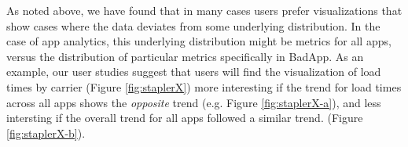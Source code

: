 \begin{example}
As noted above, we have found that in many cases 
users prefer visualizations that show
cases where the data deviates from some underlying distribution.
In the case of app analytics, this underlying distribution might be metrics for
all apps, versus the distribution of particular metrics specifically in BadApp.
As an example, our user studies suggest that users will find the visualization of load times by carrier (Figure
\ref{fig:staplerX}) more interesting if the trend for load times across all
apps shows the {\it opposite} trend (e.g. Figure \ref{fig:staplerX-a}), and less intersting if the overall trend for all apps followed a similar trend.
(Figure \ref{fig:staplerX-b}).  
\end{example}






